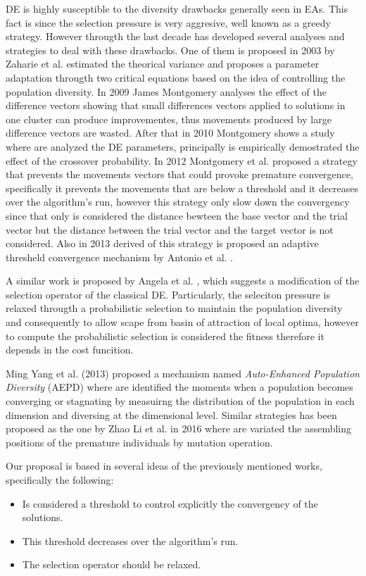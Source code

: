 DE is highly susceptible to the diversity drawbacks generally seen in EAs.
%
This fact is since the selection pressure is very aggresive, well known as a greedy strategy.
%
However througth the last decade has developed several analyses and strategies to deal with these drawbacks.
%
One of them is proposed in 2003 by Zaharie et al.  \cite{zaharie2003control} estimated the theorical variance and proposes a parameter adaptation througth two critical equations based on the idea of controlling the population diversity.
%
In 2009 James Montgomery \cite{montgomery2009differential} analyses the effect of the difference vectors showing that small differences vectors applied to solutions in one cluster can produce improvementes, thus movements produced by large difference vectors are wasted.
%
After that in 2010 Montgomery shows a study where are analyzed the DE parameters, principally is empirically demostrated the effect of the crossover probability.
%
In 2012 Montgomery et al. \cite{montgomery2012simple} proposed a strategy that prevents the movements vectors that could provoke premature convergence, specifically it prevents the movements that are below a threshold and it decreases over the algorithm's run, however this strategy only slow down the convergency since that only is considered the distance bewteen the base vector and the trial vector but the distance between the trial vector and the target vector is not considered.
%
Also in 2013 derived of this strategy is proposed an adaptive thresheld convergence mechanism by Antonio et al. \cite{bolufe2013differential}.
%

A similar work is proposed  by Angela et al. \cite{sa2008exploration}, which suggests a modification of the selection operator of the classical DE.
%
Particularly,  the seleciton pressure is relaxed througth a probabilistic selection to maintain the population diversity and consequently to allow scape from basin of attraction of local optima, however to compute the probabilistic selection is considered the fitness therefore it depends in the cost funcition.
%

Ming Yang et al. (2013) \cite{yang2015differential} proposed a mechanism named \textit{Auto-Enhanced Population Diversity} (AEPD) where are identified the moments when a population becomes converging or stagnating by measuirng the distribution of the population in each dimension and diversing at the dimensional level.
%
Similar strategies has been proposed as the one by Zhao Li et al. in 2016 \cite{zhao2016differential} where are variated the assembling positions of the premature individuals by mutation operation.


Our proposal is based in several ideas of the previously mentioned works, specifically the following:
\begin{itemize}
\item Is considered a threshold to control explicitly the convergency of the solutions.
\item This threshold decreases over the algorithm's run.
\item The selection operator should be relaxed. 
\end{itemize}

